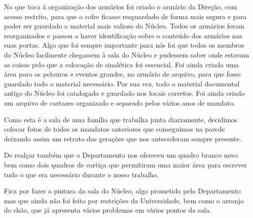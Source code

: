 No que toca à organização dos armários foi criado o armário da Direção, com acesso restrito, para que o cofre ficasse resguardado de forma mais segura e para poder ser guardado o material mais valioso do Núcleo. Todos os armários foram reorganizados e passou a haver identificação sobre o conteúdo dos armários nas suas portas. Algo que foi sempre importante para nós foi que todos os membros do Núcleo facilmente chegassem à sala do Núcleo e pudessem saber onde estavam as coisas pelo que a colocação de sinalética foi essencial. Foi ainda criada uma área para os pelouros e eventos grandes, no armário de arquivo, para que fosse guardado todo o material necessário. Por sua vez, todo o material documental antigo do Núcleo foi catalogado e guardado nos locais corretos. Foi ainda criado um arquivo de cartazes organizado e separado pelos vários anos de mandato.

Como esta é a sala de uma família que trabalha junta diariamente, decidimos colocar fotos de todos os mandatos anteriores que conseguimos na parede deixando assim um retrato das gerações que nos antecederam sempre presente.

De realçar também que o Departamento nos ofereceu um quadro branco novo bem como dois quadros de cortiça que permitiram uma maior área para escrever tudo o que era necessário durante o nosso trabalho.

Fica por fazer a pintura da sala do Núcleo, algo prometido pelo Departamento mas que ainda não foi feito por restrições da Universidade, bem como o arranjo do chão, que já apresenta vários problemas em vários pontos da sala.